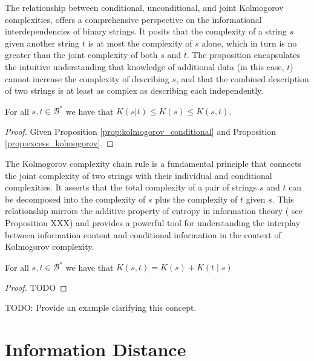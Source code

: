 The relationship between conditional, unconditional, and joint Kolmogorov complexities, offers a comprehensive perspective on the informational interdependencies of binary strings. It posits that the complexity of a string $s$ given another string $t$ is at most the complexity of $s$ alone, which in turn is no greater than the joint complexity of both $s$ and $t$. The proposition encapsulates the intuitive understanding that knowledge of additional data (in this case, $t$) cannot increase the complexity of describing $s$, and that the combined description of two strings is at least as complex as describing each independently.

\begin{proposition}
\label{prop:kolmogorov_relations}
For all $s, t\in\mathcal{B}^{\ast}$ we have that $K(s | t ) \leq K(s) \leq K(s, t)$.
\end{proposition}
\begin{proof}
Given Proposition \ref{prop:kolmogorov_conditional} and Proposition \ref{prop:excess_kolmogorov}.
\end{proof}

The Kolmogorov complexity chain rule is a fundamental principle that connects the joint complexity of two strings with their individual and conditional complexities. It asserts that the total complexity of a pair of strings $s$ and $t$ can be decomposed into the complexity of $s$ plus the complexity of $t$ given $s$. This relationship mirrors the additive property of entropy in information theory ({\color{red} see Proposition XXX}) and provides a powerful tool for understanding the interplay between information content and conditional information in the context of Kolmogorov complexity.

\begin{proposition}
\label{prop:kolmogorov_chain_rule}
For all $s, t \in \mathcal{B}^{\ast}$ we have that $K(s, t) = K(s) + K(t \mid s)$
\end{proposition}
\begin{proof}
{\color{red} TODO}
\end{proof}

\begin{example}
{\color{red} TODO: Provide an example clarifying this concept.}
\end{example}

%
%

\section{Information Distance}
\label{sec:information_distance}

